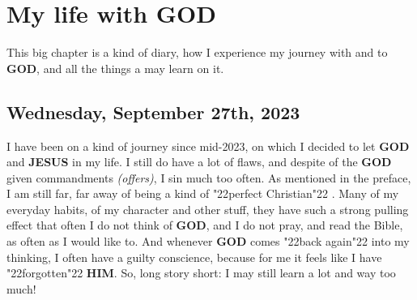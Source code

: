 \documentclass[12pt,a4paper]{article}
\newcommand{\God}[0]{\textbf{GOD}}
\newcommand{\Him}[0]{\textbf{HIM}}
\newcommand{\Jesus}[0]{\textbf{JESUS}}
\newcommand{\q}[1]{\char"22{#1}\char"22 }
\begin{document}

	\newpage
	\section{My life with {\God}} \label{MeinLebenMitGott}
		This big chapter is a kind of diary,
		how I experience my journey with and to {\God},
		and all the things a may learn on it.
	
	\subsection{Wednesday, September 27th, 2023}
		I have been on a kind of journey since mid-2023,
		on which I decided to let {\God} and {\Jesus} in my life.
		I still do have a lot of flaws,
		and despite of the {\God} given commandments \textit{(offers)},
		I sin much too often.
		As mentioned in the preface,
		I am still far,
		far away of being a kind of \q{perfect Christian}.
		Many of my everyday habits,
		of my character and other stuff,
		they have such a strong pulling effect
		that often I do not think of {\God},
		and I do not pray,
		and read the Bible,
		as often as I would like to.
		And whenever {\God} comes \q{back again} into my thinking,
		I often have a guilty conscience,
		because for me it feels like I have \q{forgotten} {\Him}.
		So,
		long story short:
		I may still learn a lot and way too much!
\end{document}
